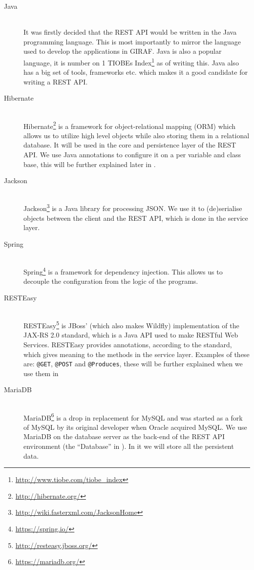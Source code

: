 \begin{description}
    \item[Java] \hfill \\
        It was firstly decided that the REST API would be written in the Java programming language.
        This is most importantly to mirror the language used to develop the applications in GIRAF.
        Java is also a popular language, it is number on 1 TIOBEs Index\footnote{\url{http://www.tiobe.com/tiobe_index}} as of writing this.
        Java also has a big set of tools, frameworks etc. which makes it a good candidate for writing a REST API.

    \item[Hibernate] \hfill \\
        Hibernate\footnote{\url{http://hibernate.org/}} is a framework for object-relational mapping (ORM) which allows us to utilize high level objects while also storing them in a relational database.
        It will be used in the core and persistence layer of the REST API.
        We use Java annotations to configure it on a per variable and class base, this will be further explained later in .

    \item[Jackson] \hfill \\
        Jackson\footnote{\url{http://wiki.fasterxml.com/JacksonHome}} is a Java library for processing JSON.
        We use it to (de)serialise objects between the client and the REST API, which is done in the service layer.

    \item[Spring] \hfill \\
        Spring\footnote{\url{https://spring.io/}} is a framework for dependency injection.
        This allows us to decouple the configuration from the logic of the programs.

    \item[RESTEasy] \hfill \\
        RESTEasy\footnote{\url{http://resteasy.jboss.org/}} is JBoss' (which also makes Wildfly) implementation of the JAX-RS 2.0 standard, which is a Java API used to make RESTful Web Services.
        RESTEasy provides annotations, according to the standard, which gives meaning to the methods in the service layer.
        Examples of these are: \texttt{@GET}, \texttt{@POST} and \texttt{@Produces}, these will be further explained when we use them in 

    \item[MariaDB] \hfill \\
        MariaDB\footnote{\url{https://mariadb.org/}} is a drop in replacement for MySQL and was started as a fork of MySQL by its original developer when Oracle acquired MySQL.
        We use MariaDB on the database server as the back-end of the REST API environment (the \enquote{Database} in ).
        In it we will store all the persistent data.
\end{description}
